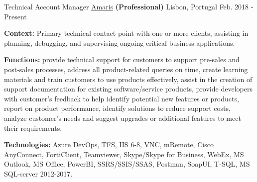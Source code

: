 \begin{cventries}


  \cventry
    {Technical Account Manager} %
    {\href{https://www.amaris.com/}{Amaris} \textbf{(Professional)}} %
    {Lisbon, Portugal} %
    {Feb. 2018 - Present} %
    {
      \begin{cvitems} %
		\item {\textbf{Context:} Primary technical contact point with one or more clients, assisting in planning, debugging, and supervising ongoing critical business applications.}
		\item {\textbf{Functions:} provide technical support for customers to support pre-sales and post-sales processes, address all product-related queries on time, create learning materials and train customers to use products effectively, assist in the creation of support documentation for existing software/service products, provide developers with customer's feedback to help identify potential new features or products, report on product performance, identify solutions to reduce support costs, analyze customer's needs and suggest upgrades or additional features to meet their requirements.}		
		\item {\textbf{Technologies:} Azure DevOps, TFS, IIS 6-8, VNC, mRemote, Cisco AnyConnect, %
FortiClient, Teamviewer, Skype/Skype for Business, WebEx, MS Outlook, MS Office, PowerBI, SSRS/SSIS/SSAS, Postman, SoapUI, T-SQL, MS SQL-server 2012-2017.}		
      \end{cvitems}
    } 
    

\end{cventries}
